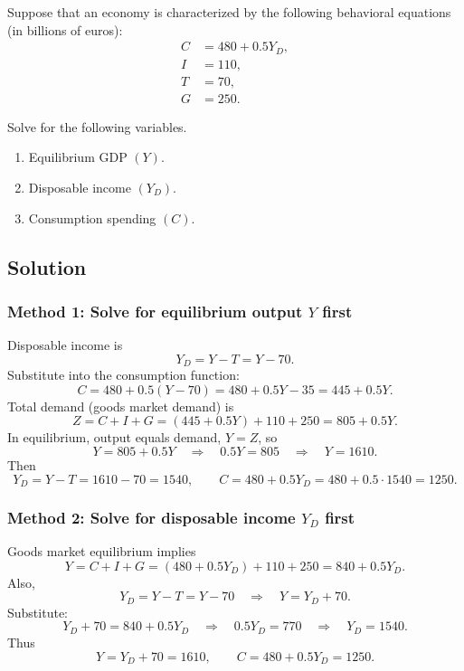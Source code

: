 \documentclass[12pt]{article}
\begin{document}
Suppose that an economy is characterized by the following behavioral equations (in billions of euros):
\begin{align*}
C &= 480 + 0.5Y_D,\\
I &= 110,\\
T &= 70,\\
G &= 250.
\end{align*}

Solve for the following variables.
\begin{enumerate}[label=(\alph*)]
\item Equilibrium GDP \((Y)\).
\item Disposable income \((Y_D)\).
\item Consumption spending \((C)\).
\end{enumerate}

\subsection*{Solution}

\subsubsection*{Method 1: Solve for equilibrium output \(Y\) first}

Disposable income is
\[
Y_D = Y - T = Y - 70.
\]
Substitute into the consumption function:
\[
C = 480 + 0.5(Y - 70) = 480 + 0.5Y - 35 = 445 + 0.5Y.
\]
Total demand (goods market demand) is
\[
Z = C + I + G = (445 + 0.5Y) + 110 + 250 = 805 + 0.5Y.
\]
In equilibrium, output equals demand, \(Y = Z\), so
\[
Y = 805 + 0.5Y
\quad\Rightarrow\quad
0.5Y = 805
\quad\Rightarrow\quad
Y = 1610.
\]
Then
\[
Y_D = Y - T = 1610 - 70 = 1540,
\qquad
C = 480 + 0.5Y_D = 480 + 0.5\cdot 1540 = 1250.
\]

\subsubsection*{Method 2: Solve for disposable income \(Y_D\) first}

Goods market equilibrium implies
\[
Y = C + I + G = (480 + 0.5Y_D) + 110 + 250 = 840 + 0.5Y_D.
\]
Also,
\[
Y_D = Y - T = Y - 70
\quad\Rightarrow\quad
Y = Y_D + 70.
\]
Substitute:
\[
Y_D + 70 = 840 + 0.5Y_D
\quad\Rightarrow\quad
0.5Y_D = 770
\quad\Rightarrow\quad
Y_D = 1540.
\]
Thus
\[
Y = Y_D + 70 = 1610,
\qquad
C = 480 + 0.5Y_D = 1250.
\]

\bigskip
\end{document}
